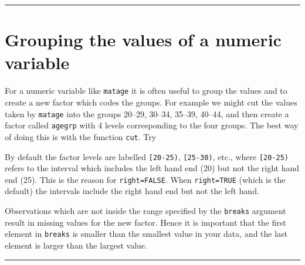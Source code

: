 \documentclass[
]{book}
\newenvironment{Shaded}{\begin{snugshade}}{\end{snugshade}}
\newcommand{\AttributeTok}[1]{\textcolor[rgb]{0.13,0.29,0.53}{#1}}
\newcommand{\ConstantTok}[1]{\textcolor[rgb]{0.56,0.35,0.01}{#1}}
\newcommand{\DecValTok}[1]{\textcolor[rgb]{0.00,0.00,0.81}{#1}}
\newcommand{\FunctionTok}[1]{\textcolor[rgb]{0.13,0.29,0.53}{\textbf{#1}}}
\newcommand{\NormalTok}[1]{#1}
\newcommand{\OtherTok}[1]{\textcolor[rgb]{0.56,0.35,0.01}{#1}}
\newcommand{\SpecialCharTok}[1]{\textcolor[rgb]{0.81,0.36,0.00}{\textbf{#1}}}
\begin{document}
\begin{center}\rule{0.5\linewidth}{0.5pt}\end{center}

\section{Grouping the values of a numeric variable}\label{grouping-the-values-of-a-numeric-variable}

For a numeric variable like \texttt{matage} it is often useful
to group the values and to create a new factor which codes the groups.
For example we might cut the values taken by \texttt{matage} into the
groups 20--29, 30--34, 35--39, 40--44, and then create a factor called
\texttt{agegrp} with 4 levels corresponding to the four groups. The best way of doing this is
with the function \texttt{cut}. Try

\begin{Shaded}
\end{Shaded}

By default the factor levels are labelled \texttt{{[}20-25)},
\texttt{{[}25-30)}, etc., where \texttt{{[}20-25)} refers to the interval
which includes the left hand end (20) but not the right hand end
(25). This is the reason for \texttt{right=FALSE}. When \texttt{right=TRUE}
(which is the default) the intervals include the right hand end but
not the left hand.

Observations which are not inside the range specified by the \texttt{breaks}
argument result in missing values for the new factor. Hence it
is important that the first element in \texttt{breaks} is smaller than the
smallest value in your data, and the last element is larger than the
largest value.

\begin{center}\rule{0.5\linewidth}{0.5pt}\end{center}
\end{document}
